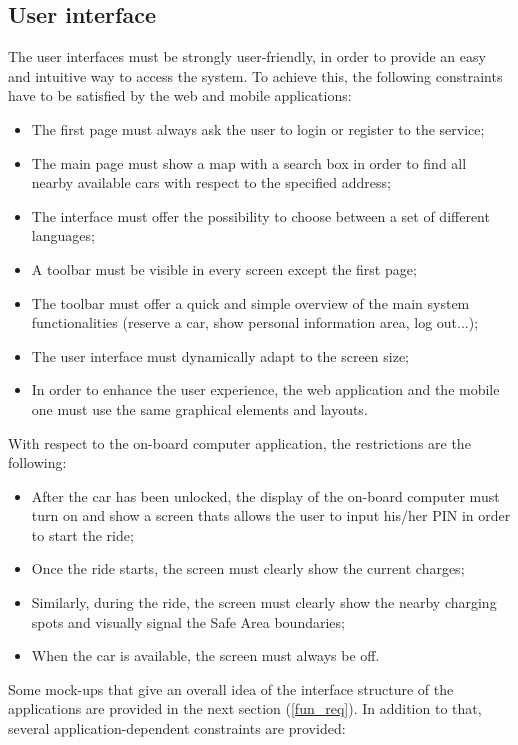 \subsection{User interface}
The user interfaces must be strongly user-friendly, in order to provide an easy and intuitive way to access the system. To achieve this, the following constraints have to be satisfied by the web and mobile applications:
\begin{itemize}
\item The first page must always ask the user to login or register to the service;
\item The main page must show a map with a search box in order to find all nearby available cars with respect to the specified address;
\item The interface must offer the possibility to choose between a set of different languages;
\item A toolbar must be visible in every screen except the first page;
\item The toolbar must offer a quick and simple overview of the main system functionalities (reserve a car, show personal information area, log out...);
\item The user interface must dynamically adapt to the screen size;
\item In order to enhance the user experience, the web application and the mobile one must use the same graphical elements and layouts.
\end{itemize}
With respect to the on-board computer application, the restrictions are the following:
\begin{itemize}
\item After the car has been unlocked, the display of the on-board computer must turn on and show a screen thats allows the user to input his/her PIN in order to start the ride;
\item Once the ride starts, the screen must clearly show the current charges;
\item Similarly, during the ride, the screen must clearly show the nearby charging spots and visually signal the Safe Area boundaries;
\item When the car is available, the screen must always be off.
\end{itemize}
Some mock-ups that give an overall idea of the interface structure of the applications are provided in the next section (\ref{fun_req}).
In addition to that, several application-dependent constraints are provided:
